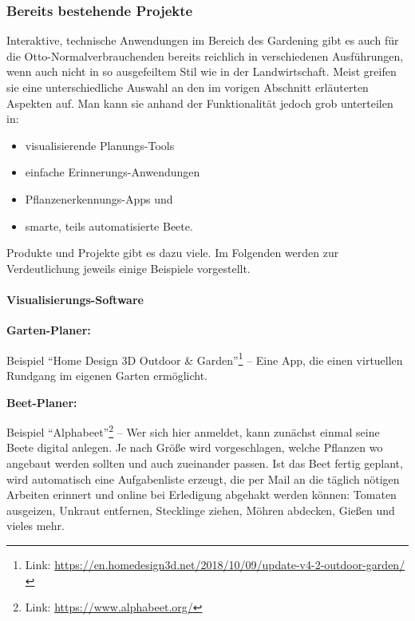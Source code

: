 \hypertarget{bereits-bestehende-projekte}{%
\subsubsection{Bereits bestehende
Projekte}\label{bereits-bestehende-projekte}}

Interaktive, technische Anwendungen im Bereich des Gardening gibt es
auch für die Otto-Normalverbrauchenden bereits reichlich in
verschiedenen Ausführungen, wenn auch nicht in so ausgefeiltem Stil wie
in der Landwirtschaft. Meist greifen sie eine unterschiedliche Auswahl
an den im vorigen Abschnitt erläuterten Aspekten auf. Man kann sie
anhand der Funktionalität jedoch grob unterteilen in:

\begin{itemize}
\tightlist
\item
  visualisierende Planungs-Tools
\item
  einfache Erinnerungs-Anwendungen
\item
  Pflanzenerkennungs-Apps und
\item
  smarte, teils automatisierte Beete.
\end{itemize}

Produkte und Projekte gibt es dazu viele. Im Folgenden werden zur
Verdeutlichung jeweils einige Beispiele vorgestellt.

\hypertarget{visualisierungs-software}{%
\paragraph{Visualisierungs-Software}\label{visualisierungs-software}}

\textbf{Garten-Planer:}

Beispiel ``Home Design 3D Outdoor \& Garden''\footnote{Link:
  \url{https://en.homedesign3d.net/2018/10/09/update-v4-2-outdoor-garden/}}
-- Eine App, die einen virtuellen Rundgang im eigenen Garten ermöglicht.

\textbf{Beet-Planer:}

Beispiel ``Alphabeet''\footnote{Link: \url{https://www.alphabeet.org/}}
-- Wer sich hier anmeldet, kann zunächst einmal seine Beete digital
anlegen. Je nach Größe wird vorgeschlagen, welche Pflanzen wo angebaut
werden sollten und auch zueinander passen. Ist das Beet fertig geplant,
wird automatisch eine Aufgabenliste erzeugt, die per Mail an die täglich
nötigen Arbeiten erinnert und online bei Erledigung abgehakt werden
können: Tomaten ausgeizen, Unkraut entfernen, Stecklinge ziehen, Möhren
abdecken, Gießen und vieles mehr.

